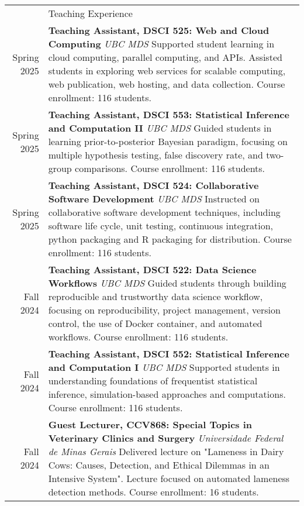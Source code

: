 \documentclass[letterpaper, 11pt]{article}
\newcommand{\headingfont}{\Large\color{OliveGreen}}
\newenvironment{SectionTable}[1]{
	\renewcommand*{\arraystretch}{1.7}
	\setlength{\tabcolsep}{10pt}
	\begin{longtable}{Rp{5.2in}} & #1 \\}
{\end{longtable}\vspace{-.3cm}}
\begin{document}
\begin{SectionTable}{\headingfont Teaching Experience}
Spring 2025 & 
\textbf{Teaching Assistant, DSCI 525: Web and Cloud Computing} \newline 
\textit{UBC MDS}\newline
Supported student learning in cloud computing, parallel computing, and APIs. Assisted students in exploring web services for scalable computing, web publication, web hosting, and data collection. Course enrollment: 116 students. \\
Spring 2025 & 
\textbf{Teaching Assistant, DSCI 553: Statistical Inference and Computation II} \newline
\textit{UBC MDS} \newline
Guided students in learning prior-to-posterior Bayesian paradigm, focusing on multiple hypothesis testing, false discovery rate, and two-group comparisons. Course enrollment: 116 students. \\
Spring 2025 & 
\textbf{Teaching Assistant, DSCI 524: Collaborative Software Development} \newline
\textit{UBC MDS} \newline
Instructed on collaborative software development techniques, including software life cycle, unit testing, continuous integration, python packaging and R packaging for distribution. Course enrollment: 116 students. \\
Fall 2024 & 
\textbf{Teaching Assistant, DSCI 522: Data Science Workflows} \newline
\textit{UBC MDS} \newline
Guided students through building reproducible and trustworthy data science workflow, focusing on reproducibility, project management, version control, the use of Docker container, and automated workflows. Course enrollment: 116 students. \\
Fall 2024 & 
\textbf{Teaching Assistant, DSCI 552: Statistical Inference and Computation I} \newline
\textit{UBC MDS} \newline
Supported students in understanding foundations of frequentist statistical inference, simulation-based approaches and  computations. Course enrollment: 116 students. \\
Fall 2024 & 
\textbf{Guest Lecturer, CCV868: Special Topics in Veterinary Clinics and Surgery} \newline
\textit{Universidade Federal de Minas Gerais} \newline
Delivered lecture on "Lameness in Dairy Cows: Causes, Detection, and Ethical Dilemmas in an Intensive System". Lecture focused on automated lameness detection methods. Course enrollment: 16 students. \\

\end{SectionTable}
\end{document}

